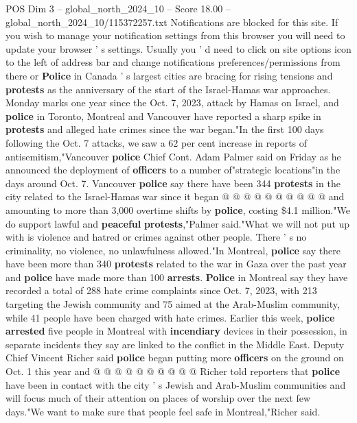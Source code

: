 \begin{textsample}{POS Dim 3 – global\_north\_2024\_10 – Score 18.00 – global\_north\_2024\_10/115372257.txt}  \label{ex:f3_pos_128}
Notifications are blocked for this site.
If you wish to manage your notification settings from this browser you will need to update your browser ' s settings.
Usually you ' d need to click on site options icon to the left of address bar and change notifications preferences/permissions from there or \textbf{Police} in Canada ' s largest cities are bracing for rising tensions and \textbf{protests} as the anniversary of the start of the Israel-Hamas war approaches.
Monday marks one year since the Oct. 7, 2023, attack by Hamas on Israel, and \textbf{police} in Toronto, Montreal and Vancouver have reported a sharp spike in \textbf{protests} and alleged hate crimes since the war began."In the first 100 days following the Oct. 7 attacks, we saw a 62 per cent increase in reports of antisemitism,"Vancouver \textbf{police} Chief Cont.
Adam Palmer said on Friday as he announced the deployment of \textbf{officers} to a number of"strategic locations"in the days around Oct. 7.
Vancouver \textbf{police} say there have been 344 \textbf{protests} in the city related to the Israel-Hamas war since it began @ @ @ @ @ @ @ @ @ @ and amounting to more than 3,000 overtime shifts by \textbf{police}, costing \$4.1 million."We do support lawful and \textbf{peaceful} \textbf{protests},"Palmer said."What we will not put up with is violence and hatred or crimes against other people.
There ' s no criminality, no violence, no unlawfulness allowed."In Montreal, \textbf{police} say there have been more than 340 \textbf{protests} related to the war in Gaza over the past year and \textbf{police} have made more than 100 \textbf{arrests}. \textbf{Police} in Montreal say they have recorded a total of 288 hate crime complaints since Oct. 7, 2023, with 213 targeting the Jewish community and 75 aimed at the Arab-Muslim community, while 41 people have been charged with hate crimes.
Earlier this week, \textbf{police} \textbf{arrested} five people in Montreal with \textbf{incendiary} devices in their possession, in separate incidents they say are linked to the conflict in the Middle East.
Deputy Chief Vincent Richer said \textbf{police} began putting more \textbf{officers} on the ground on Oct. 1 this year and @ @ @ @ @ @ @ @ @ @ Richer told reporters that \textbf{police} have been in contact with the city ' s Jewish and Arab-Muslim communities and will focus much of their attention on places of worship over the next few days."We want to make sure that people feel safe in Montreal,"Richer said.

\end{textsample}
